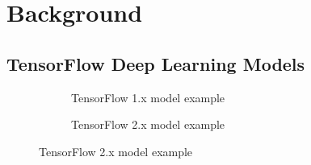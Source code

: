 \section{Background}\label{sec:background}

\subsection{TensorFlow Deep Learning Models}


\begin{figure}[t!]
    \centering
    \begin{subfigure}[b]{\textwidth}
      
      \caption{TensorFlow 1.x model example}
      \label{fig:back:tf1}
    \end{subfigure}   
    \begin{subfigure}[b]{\textwidth}
      
      \caption{TensorFlow 2.x model example}
      \label{fig:back:tf2}
    \end{subfigure}   
\end{figure}

